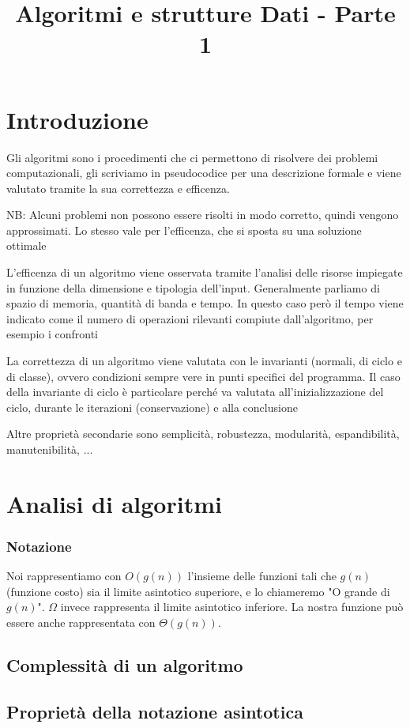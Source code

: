 \documentclass[12pt, a4paper]{article}
\title{Algoritmi e strutture Dati - Parte 1}
\begin{document}
    

\section{Introduzione}
Gli algoritmi sono i procedimenti che ci permettono di risolvere dei problemi computazionali, gli scriviamo in 
pseudocodice per una descrizione formale e viene valutato tramite la sua correttezza e efficenza. 

NB: Alcuni problemi non possono essere risolti in modo corretto, quindi vengono approssimati. Lo stesso vale per
l'efficenza, che si sposta su una soluzione ottimale

L'efficenza di un algoritmo viene osservata tramite l'analisi delle risorse impiegate in funzione della dimensione
e tipologia dell'input. Generalmente parliamo di spazio di memoria, quantità di banda e tempo. In questo caso
però il tempo viene indicato come il numero di operazioni rilevanti compiute dall'algoritmo, per esempio i
confronti

La correttezza di un algoritmo viene valutata con le invarianti (normali, di ciclo e di classe), ovvero condizioni
sempre vere in punti specifici del programma. Il caso della invariante di ciclo è particolare perché va valutata
all'inizializzazione del ciclo, durante le iterazioni (conservazione) e alla conclusione

Altre proprietà secondarie sono semplicità, robustezza, modularità, espandibilità, manutenibilità, ...

\newpage
\section{Analisi di algoritmi}
\subsubsection*{Notazione}
Noi rappresentiamo con $O(g(n))$ l'insieme delle funzioni tali che $g(n)$ (funzione costo) sia il limite asintotico
superiore, e lo chiameremo "O grande di $g(n)$". $\Omega$ invece rappresenta il limite asintotico inferiore.
La nostra funzione può essere anche rappresentata con $\Theta(g(n))$.

\subsection{Complessità di un algoritmo}

\subsection{Proprietà della notazione asintotica}
\end{document}
